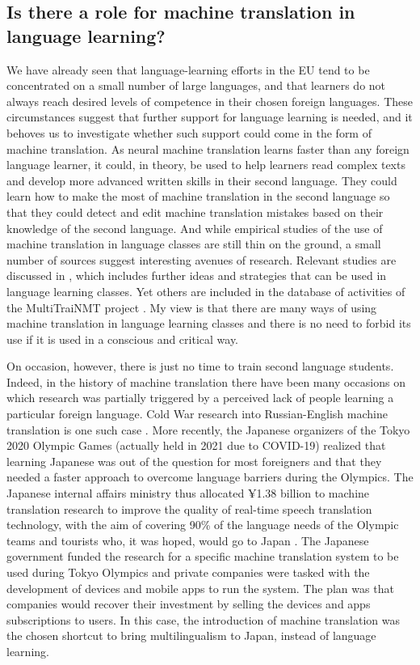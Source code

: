 \documentclass[output=paper]{langscibook}
\begin{document}

\subsection{Is there a role for machine translation in language learning?}

We have already seen that language-learning efforts in the EU tend to be concentrated on a small number of large languages, and that learners do not always reach desired levels of competence in their chosen foreign languages. These circumstances suggest that further support for language learning is needed, and it behoves us to investigate whether such support could come in the form of machine translation. As neural machine translation learns faster than any foreign language learner, it could, in theory, be used to help learners read complex texts and develop more advanced written skills in their second language. They could learn how to make the most of machine translation in the second language so that they could detect and edit machine translation mistakes based on their knowledge of the second language. And while empirical studies of the use of machine translation in language classes are still thin on the ground, a small number of sources suggest interesting avenues of research. Relevant studies are discussed in , which includes further ideas and strategies that can be used in language learning classes. Yet others are included in the database of activities of the MultiTraiNMT project \citep{MultiTraiNMT2020}. My view is that there are many ways of using machine translation in language learning classes and there is no need to forbid its use if it is used in a conscious and critical way.

On occasion, however, there is just no time to train second language students. Indeed, in the history of machine translation there have been many occasions on which research was partially triggered by a perceived lack of people learning a particular foreign language. Cold War research into Russian-English machine translation is one such case \citep{Gordin2016}. More recently, the Japanese organizers of the Tokyo 2020 Olympic Games (actually held in 2021 due to COVID-19) realized that learning Japanese was out of the question for most foreigners and that they needed a faster approach to overcome language barriers during the Olympics. The Japanese internal affairs ministry thus allocated ¥1.38 billion to machine translation research to improve the quality of real-time speech translation technology, with the aim of covering 90\% of the language needs of the Olympic teams and tourists who, it was hoped, would go to Japan \citep{Murai2015}. The Japanese government funded the research for a specific machine translation system to be used during Tokyo Olympics and private companies were tasked with the development of devices and mobile apps to run the system. The plan was that companies would recover their investment by selling the devices and apps subscriptions to users. In this case, the introduction of machine translation was the chosen shortcut to bring multilingualism to Japan, instead of language learning.
\end{document}
